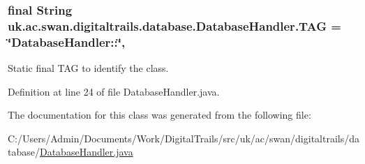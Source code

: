 \hypertarget{classuk_1_1ac_1_1swan_1_1digitaltrails_1_1database_1_1_database_handler_a2d7948efbfb8eaff5813d02948a2b704}{
\subsubsection[{T\+A\+G}]{\setlength{\rightskip}{0pt plus 5cm}final String uk.\+ac.\+swan.\+digitaltrails.\+database.\+Database\+Handler.\+T\+A\+G = \char`\"{}Database\+Handler\+::\char`\"{}\hspace{0.3cm}{\ttfamily [static]}, {\ttfamily [private]}}}\label{classuk_1_1ac_1_1swan_1_1digitaltrails_1_1database_1_1_database_handler_a2d7948efbfb8eaff5813d02948a2b704}


Static final T\+A\+G to identify the class. 



Definition at line 24 of file Database\+Handler.\+java.



The documentation for this class was generated from the following file\+:\begin{DoxyCompactItemize}
\item 
C\+:/\+Users/\+Admin/\+Documents/\+Work/\+Digital\+Trails/src/uk/ac/swan/digitaltrails/database/\hyperlink{_database_handler_8java}{Database\+Handler.\+java}\end{DoxyCompactItemize}
